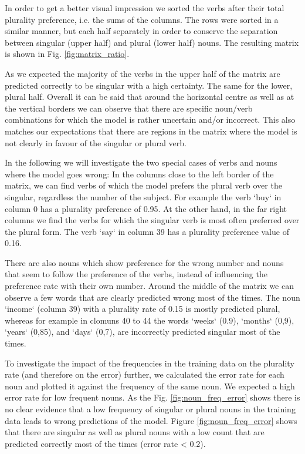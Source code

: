 In order to get a better visual impression we sorted the verbs 
after their total plurality preference, i.e. the sums of the columns. 
The rows were sorted in a similar manner, but each half separately in order to conserve the separation between singular (upper half) and plural (lower half) nouns. The resulting matrix is shown in Fig. \ref{fig:matrix_ratio}.

As we expected the majority of the verbs in the upper half of the matrix are predicted correctly to be singular with a high certainty. The same for the lower, plural half. Overall it can be said that around the horizontal centre 
as well as at the vertical borders we can observe that there are specific noun/verb combinations for which the model is rather uncertain and/or incorrect. This also matches our expectations that there are regions in the matrix where the model is not clearly in favour of the singular or plural verb. 

In the following we will investigate the two special cases of verbs and nouns where the model goes wrong: 
In the columns close to the left border of the matrix, we can find verbs of which the model prefers the plural verb over the singular, regardless the number of the subject. For example the verb `buy` in column 0 has a plurality preference of 0.95. At the other hand, in the far right columns we find the verbs for which the singular verb is most often preferred over the plural form. The verb `say` in column 39 has a plurality preference value of 0.16.

There are also nouns which show preference for the wrong number and nouns
that seem to follow the preference of the verbs, 
instead of influencing the preference rate with their own number.
Around the middle of the matrix we can observe a few words that are clearly predicted wrong most of the times. The noun `income` (column 39) with a plurality rate of 0.15 is mostly predicted plural, whereas for example in clomuns 40 to 44 the words `weeks` (0.9), `months` (0,9), `years` (0,85), and `days` (0,7), are incorrectly predicted singular most of the times.

    
To investigate the impact of the frequencies in the training data on the plurality rate (and therefore on the error) further, we calculated the error rate for each noun and plotted it against the frequency of the same noun. We expected a high error rate for low frequent nouns. As the Fig. \ref{fig:noun_freq_error} shows there is no clear evidence that a low frequency of singular or plural nouns in the training data leads to wrong predictions of the model. Figure \ref{fig:noun_freq_error} shows that there are singular as well as plural nouns with a low count that are predicted correctly most of the times (error rate < 0.2).

